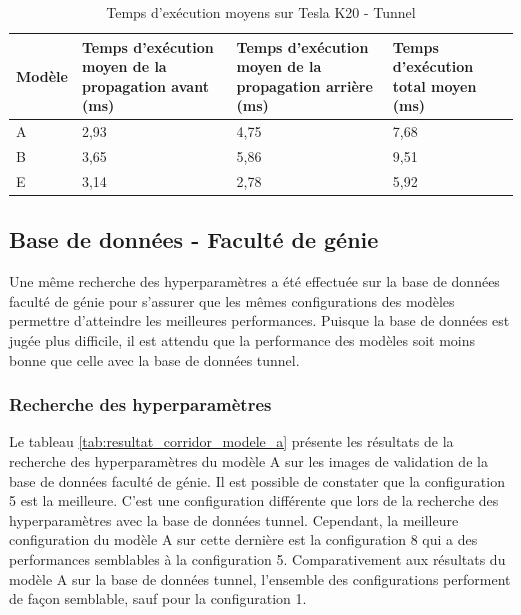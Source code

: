     \begin{table}
        \centering
        \caption{Temps d'exécution moyens sur Tesla K20 - Tunnel}
        \label{tab:resultat_tunnel_temps_execution}
        \begin{tabular}{lp{4cm}p{4cm}p{4cm}}
            \midrule
            Modèle & Temps d'exécution moyen de la propagation avant (ms) & Temps d'exécution moyen de la propagation arrière (ms) & Temps d'exécution total moyen (ms)\\
            \midrule\midrule
            A & 2,93 & 4,75 & 7,68\\
            B & 3,65 & 5,86 & 9,51\\
            E & 3,14 & 2,78 & 5,92\\
            \midrule
        \end{tabular}
    \end{table}

\subsection{Base de données - Faculté de génie}
    Une même recherche des hyperparamètres a été effectuée sur la base de données faculté de génie pour s'assurer que les mêmes configurations des modèles permettre d'atteindre les meilleures performances. Puisque la base de données est jugée plus difficile, il est attendu que la performance des modèles soit moins bonne que celle avec la base de données tunnel.
    
\subsubsection{Recherche des hyperparamètres}
    Le tableau \ref{tab:resultat_corridor_modele_a} présente les résultats de la recherche des hyperparamètres du modèle A sur les images de validation de la base de données faculté de génie. Il est possible de constater que la configuration 5 est la meilleure. C'est une configuration différente que lors de la recherche des hyperparamètres avec la base de données tunnel. Cependant, la meilleure configuration du modèle A sur cette dernière est la configuration 8 qui a des performances semblables à la configuration 5. Comparativement aux résultats du modèle A sur la base de données tunnel, l'ensemble des configurations performent de façon semblable, sauf pour la configuration 1.\\
    
